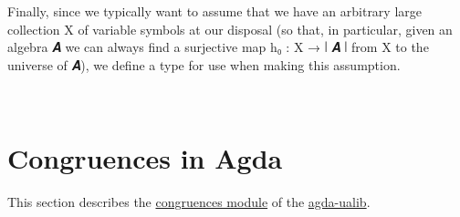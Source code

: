 \documentclass[sigplan,screen]{acmart}
\newcommand{\agdaualib}{\href{https://ualib.org}{agda-ualib}\xspace}
\newcommand\congruencesmodule{\href{https://gitlab.com/ualib/ualib.gitlab.io/-/blob/master/congruences.lagda.rst}{congruences module}\xspace}
\begin{document}
Finally, since we typically want to assume that we have an arbitrary large collection X of variable symbols at our disposal (so that, in particular, given an algebra 𝑨 we can always find a surjective map h₀ : X → ∣ 𝑨 ∣ from X to the universe of 𝑨), we define a type for use when making this assumption.

\begin{code}%
%
\>[1]\AgdaSpace{}%
\AgdaSymbol{:}\AgdaSpace{}%
\AgdaSpace{}%
\AgdaSpace{}%
\AgdaSpace{}%
\AgdaSpace{}%
\AgdaSpace{}%
\AgdaSpace{}%
\AgdaSpace{}%
\AgdaSpace{}%
\AgdaSpace{}%
\AgdaSpace{}%
\<%
\\
%
\>[1]\AgdaSpace{}%
\AgdaSpace{}%
\AgdaSpace{}%
\AgdaSymbol{=}\AgdaSpace{}%
\AgdaSpace{}%
\AgdaSpace{}%
\AgdaSpace{}%
\AgdaSymbol{(}\AgdaSpace{}%
\AgdaSpace{}%
\AgdaSpace{}%
\AgdaSpace{}%
\AgdaSymbol{)}\AgdaSpace{}%
\AgdaFunction{,}\AgdaSpace{}%
\AgdaSpace{}%
\<%
\end{code}



\section{Congruences in Agda}\label{congruences-in-agda}
This section describes the \congruencesmodule of the \agdaualib.
\end{document}
